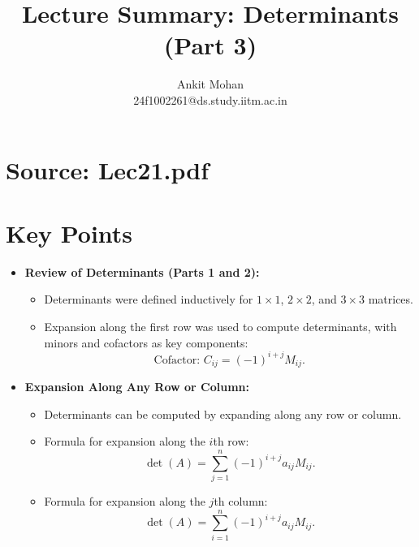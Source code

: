 \documentclass{article}
\title{Lecture Summary: Determinants (Part 3)}
\author{Ankit Mohan \\ 24f1002261@ds.study.iitm.ac.in}
\begin{document}
\maketitle

\section*{Source: Lec21.pdf}

\section*{Key Points}

\begin{itemize}
  \item \textbf{Review of Determinants (Parts 1 and 2):}
    \begin{itemize}
      \item Determinants were defined inductively for $1 \times 1$, $2 \times 2$, and $3 \times 3$ matrices.
      \item Expansion along the first row was used to compute determinants, with minors and cofactors as key components:
        \[
          \text{Cofactor: } C_{ij} = (-1)^{i+j} M_{ij}.
        \]
    \end{itemize}

  \item \textbf{Expansion Along Any Row or Column:}
    \begin{itemize}
      \item Determinants can be computed by expanding along any row or column.
      \item Formula for expansion along the $i$th row:
        \[
          \det(A) = \sum_{j=1}^n (-1)^{i+j} a_{ij} M_{ij}.
        \]
      \item Formula for expansion along the $j$th column:
        \[
          \det(A) = \sum_{i=1}^n (-1)^{i+j} a_{ij} M_{ij}.
        \]
    \end{itemize}


\end{itemize}
\end{document}
